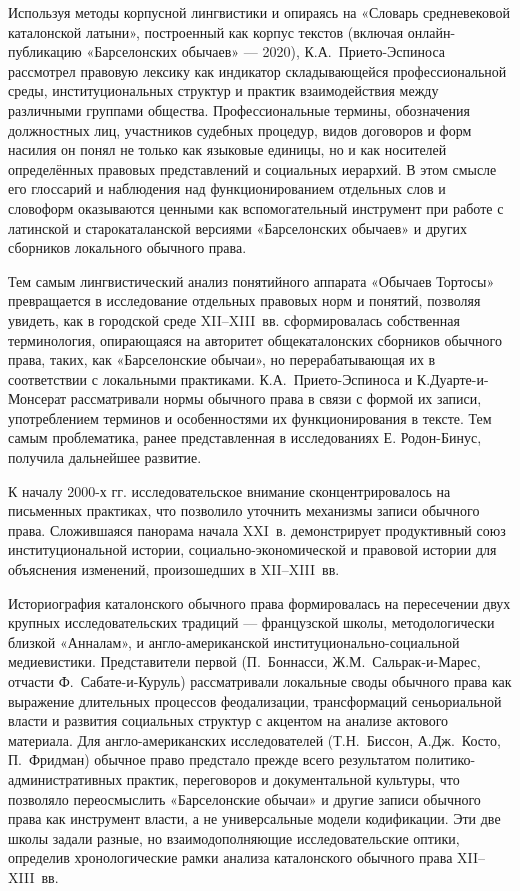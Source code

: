 Используя методы корпусной лингвистики и опираясь на «Словарь средневековой каталонской латыни», построенный как корпус текстов (включая онлайн-публикацию «Барселонских обычаев» --- 2020), К.А.~Прието-Эспиноса рассмотрел правовую лексику как индикатор складывающейся профессиональной среды, институциональных структур и практик взаимодействия между различными группами общества. Профессиональные термины, обозначения должностных лиц, участников судебных процедур, видов договоров и форм насилия он понял не только как языковые единицы, но и как носителей определённых правовых представлений и социальных иерархий. В этом смысле его глоссарий и наблюдения над функционированием отдельных слов и словоформ оказываются ценными как вспомогательный инструмент при работе с латинской и старокаталанской версиями «Барселонских обычаев» и других сборников локального обычного права.

Тем самым лингвистический анализ понятийного аппарата «Обычаев Тортосы» превращается в исследование отдельных правовых норм и понятий, позволяя увидеть, как в городской среде XII--XIII~вв. сформировалась собственная терминология, опирающаяся на авторитет общекаталонских сборников обычного права, таких, как «Барселонские обычаи», но перерабатывающая их в соответствии с локальными практиками. К.А.~Прието-Эспиноса и К.Дуарте-и-Монсерат рассматривали нормы обычного права в связи с формой их записи, употреблением терминов и особенностями их функционирования в тексте. Тем самым проблематика, ранее представленная в исследованиях Е. Родон-Бинус, получила дальнейшее развитие.

К началу 2000-х гг. исследовательское внимание сконцентрировалось на письменных практиках, что позволило уточнить механизмы записи обычного права. Сложившаяся панорама начала XXI~в. демонстрирует продуктивный союз институциональной истории, социально-экономической и правовой истории для объяснения изменений, произошедших в XII--XIII~вв.

Историография каталонского обычного права формировалась на пересечении двух крупных исследовательских традиций --- французской школы, методологически близкой «Анналам», и англо-американской институционально-социальной медиевистики. Представители первой (П.~Боннасси, Ж.М.~Сальрак-и-Марес, отчасти Ф.~Сабате-и-Куруль) рассматривали локальные своды обычного права как выражение длительных процессов феодализации, трансформаций сеньориальной власти и развития социальных структур с акцентом на анализе актового материала. Для англо-американских исследователей (Т.Н.~Биссон, А.Дж.~Косто, П.~Фридман) обычное право предстало прежде всего результатом политико-административных практик, переговоров и документальной культуры, что позволяло переосмыслить «Барселонские обычаи» и другие записи обычного права как инструмент власти, а не универсальные модели кодификации. Эти две школы задали разные, но взаимодополняющие исследовательские оптики, определив хронологические рамки анализа каталонского обычного права XII--XIII~вв.

